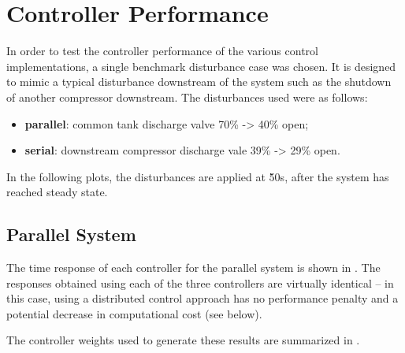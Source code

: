 \section{Controller Performance}
\label{sec:results:performance}

\newif\ifmakeplots
\makeplotstrue


In order to test the controller performance of the various control implementations, a single benchmark disturbance case was chosen.
It is designed to mimic a typical disturbance downstream of the system such as the shutdown of another compressor downstream.
The disturbances used were as follows:

\begin{itemize}
  \item \textbf{parallel}: common tank discharge valve 70\% -> 40\% open;
  \item \textbf{serial}: downstream compressor discharge vale 39\% -> 29\% open.
\end{itemize}
In the following plots, the disturbances are applied at \u{50}{s}, after the system has reached steady state.


\subsection{Parallel System}
\label{sec:results:performance:parallel}


The time response of each controller for the parallel system is shown in .
The responses obtained using each of the three controllers are virtually identical -- in this case, using a distributed control approach has no performance penalty and a potential decrease in computational cost (see below). 

The controller weights used to generate these results are summarized in .

